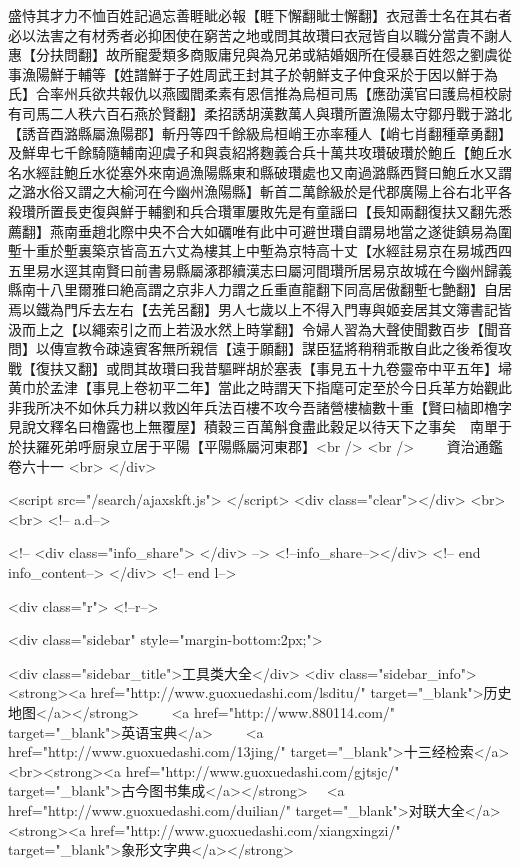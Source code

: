 盛恃其才力不恤百姓記過忘善睚眦必報【睚下懈翻眦士懈翻】衣冠善士名在其右者必以法害之有材秀者必抑困使在窮苦之地或問其故瓚曰衣冠皆自以職分當貴不謝人惠【分扶問翻】故所寵愛類多商販庸兒與為兄弟或結婚姻所在侵暴百姓怨之劉虞從事漁陽鮮于輔等【姓譜鮮于子姓周武王封其子於朝鮮支子仲食采於于因以鮮于為氏】合率州兵欲共報仇以燕國閻柔素有恩信推為烏桓司馬【應劭漢官曰護烏桓校尉有司馬二人秩六百石燕於賢翻】柔招誘胡漢數萬人與瓚所置漁陽太守鄒丹戰于潞北【誘音酉潞縣屬漁陽郡】斬丹等四千餘級烏桓峭王亦率種人【峭七肖翻種章勇翻】及鮮卑七千餘騎隨輔南迎虞子和與袁紹將麴義合兵十萬共攻瓚破瓚於鮑丘【鮑丘水名水經註鮑丘水從塞外來南過漁陽縣東和縣破瓚處也又南過潞縣西賢曰鮑丘水又謂之潞水俗又謂之大榆河在今幽州漁陽縣】斬首二萬餘級於是代郡廣陽上谷右北平各殺瓚所置長吏復與鮮于輔劉和兵合瓚軍屢敗先是有童謡曰【長知兩翻復扶又翻先悉薦翻】燕南垂趙北際中央不合大如礪唯有此中可避世瓚自謂易地當之遂徙鎮易為圍塹十重於塹裏築京皆高五六丈為樓其上中塹為京特高十丈【水經註易京在易城西四五里易水逕其南賢曰前書易縣屬涿郡續漢志曰屬河間瓚所居易京故城在今幽州歸義縣南十八里爾雅曰絶高謂之京非人力謂之丘重直龍翻下同高居傲翻塹七艶翻】自居焉以鐵為門斥去左右【去羌呂翻】男人七歲以上不得入門專與姬妾居其文簿書記皆汲而上之【以繩索引之而上若汲水然上時掌翻】令婦人習為大聲使聞數百步【聞音問】以傳宣教令疎遠賓客無所親信【遠于願翻】謀臣猛將稍稍乖散自此之後希復攻戰【復扶又翻】或問其故瓚曰我昔驅畔胡於塞表【事見五十九卷靈帝中平五年】埽黄巾於孟津【事見上卷初平二年】當此之時謂天下指麾可定至於今日兵革方始觀此非我所决不如休兵力耕以救凶年兵法百樓不攻今吾諸營樓樐數十重【賢曰樐即櫓字見說文釋名曰櫓露也上無覆屋】積穀三百萬斛食盡此穀足以待天下之事矣　南單于於扶羅死弟呼厨泉立居于平陽【平陽縣屬河東郡】<br />
<br />
　　資治通鑑卷六十一  <br>
   </div> 

<script src="/search/ajaxskft.js"> </script>
 <div class="clear"></div>
<br>
<br>
 <!-- a.d-->

 <!--
<div class="info_share">
</div> 
-->
 <!--info_share--></div>   <!-- end info_content-->
  </div> <!-- end l-->

<div class="r">   <!--r-->



<div class="sidebar"  style="margin-bottom:2px;">

 
<div class="sidebar_title">工具类大全</div>
<div class="sidebar_info">
<strong><a href="http://www.guoxuedashi.com/lsditu/" target="_blank">历史地图</a></strong>　　
<a href="http://www.880114.com/" target="_blank">英语宝典</a>　　
<a href="http://www.guoxuedashi.com/13jing/" target="_blank">十三经检索</a>　
<br><strong><a href="http://www.guoxuedashi.com/gjtsjc/" target="_blank">古今图书集成</a></strong>　
<a href="http://www.guoxuedashi.com/duilian/" target="_blank">对联大全</a>　<strong><a href="http://www.guoxuedashi.com/xiangxingzi/" target="_blank">象形文字典</a></strong>　


